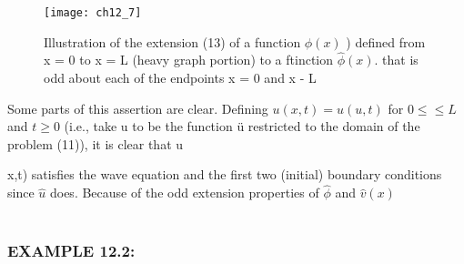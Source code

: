 \documentclass[../main.tex]{subfiles}
\begin{document}
\begin{figure}[H]
	\centering
	\texttt{[image: ch12\_7]}
	\caption{\textsf{  Illustration of the extension (13) of a function $\phi(x)$ ) defined from x = 0 to x
= L (heavy graph portion) to a ftinction $\hat{\phi}(x)$. that is odd about each of the endpoints x = 0
and x - L }}
	\label{pfig:ch12_7}
\end{figure}
Some parts of this assertion are clear. Defining $u(x,t) = \hat{u} (u,t)$ for $ 0\leqslant \leqslant L$ and $ t\geq 0$  (i.e., take u to be the function ü restricted to the domain of the 
problem (11)), it is clear that u{x,t) satisfies the wave equation and the first two 
(initial) boundary conditions since $\hat{u}$ does. Because of the odd extension 
properties of $\hat{\phi}$ and $ \hat{v} (x)$ 
\\
\\
\subsubsection{EXAMPLE 12.2:}

}
\end{document}
